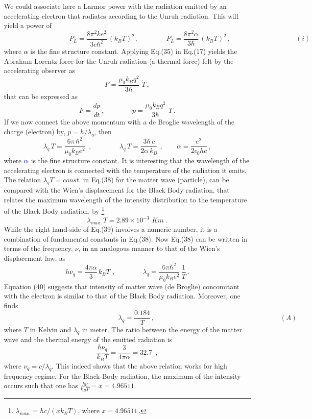 \documentclass[12pt]{article}
\begin{document}
We could associate here a Larmor power with the radiation emitted by an accelerating electron that radiates according to the Unruh radiation. This will yield a power of
$$\hspace{4cm}P_L=\frac{8\pi^2ke^2}{3c\hbar^2}\, (k_BT)^2\,,\qquad\qquad P_L=\frac{8\pi^2\alpha}{3\hbar}\, (k_BT)^2\,,\hspace{4cm} (i)$$
where $\alpha$ is the fine structure constant.
Applying Eq.(35) in Eq.(17) yields the Abraham-Lorentz force for the Unruh radiation (a thermal force) felt by the accelerating observer as
\begin{equation}
F=\frac{\mu_0k_Bq^2}{3\hbar}\,\,\dot T\,,
\end{equation}
that can be expressed as
\begin{equation}
F=\frac{dp}{dt}\,,\qquad\qquad p=\frac{\mu_0k_Bq^2}{3\hbar}\,\,T\,.
\end{equation}
If we  now connect the above momentum with a de Broglie wavelength of the charge (electron) by, $p=h/\lambda_q$,  then
\begin{equation}
\lambda_q\, T=\frac{6\pi\,\hbar^2}{\mu_0k_Be^2}\,\,\,, \qquad\qquad \lambda_q\, T=\frac{3\hbar\,c}{2\alpha\, k_B}\,\,,\qquad \alpha=\frac{e^2}{2\epsilon_0hc}\,,
\end{equation}
where $\textcolor[rgb]{0.00,0.00,1.00}{\alpha}$ is the fine structure constant. It is interesting that the wavelength of the accelerating electron is connected with the temperature of the radiation it emits. The relation $\lambda_qT=const.$ in Eq.(38) for the matter wave (particle), can be compared with the Wien's displacement for the Black Body radiation, that relates the maximum wavelength of the intensity  distribution to the temperature of the Black Body radiation, by \footnote{$\lambda_{max.}=hc/(xk_BT)$, where $x=4.96511$\,.}
\begin{equation}
\lambda_{max.}\, T=2.89\times 10^{-3}\, \, K m\,\,.
\end{equation}
While the right hand-side of Eq.(39) involves a numeric number, it is a combination of fundamental constants in Eq.(38).
Now Eq.(38) can be written in terms of the frequency, $\nu$, in an analogous manner to that of the Wien's displacement law, as
\begin{equation}
h\nu_q=\frac{4\pi \alpha}{3}\, k_BT\,\,,\qquad\qquad \lambda_q=\frac{6\pi \hbar^2}{\mu_0k_Be^2}\,\frac{1}{T}\,.
\end{equation}
Equation (40) suggests that intensity of matter wave (de Broglie) concomitant with the electron is similar to that of the Black Body radiation. Moreover, one finds
$$\hspace{7cm}\lambda_q=\frac{0.184}{T}\,, \qquad\qquad \hspace{6cm}(A)$$
where $T$ in Kelvin and $\lambda_q$ in meter.
The ratio between the   energy of the matter wave and the thermal energy of the emitted radiation  is
\begin{equation}
\frac{h\nu_q}{k_BT}=\frac{3}{4\pi \alpha}=32.7\,\,\,,
\end{equation}
where $\nu_q=c/\lambda_q$. This indeed shows that the above relation works for high frequency regime. For the Black-Body radiation, the maximum of the intensity occurs such that one has $\frac{h\nu}{k_BT}=x=4.96511$.
\end{document}
